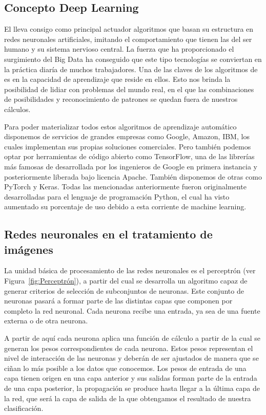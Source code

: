 \subsection{Concepto Deep Learning}\label{subsec:concepto-deep-learning}
El  lleva consigo como principal actuador algoritmos que basan su estructura en redes neuronales artificiales, imitando el comportamiento que tienen las del ser humano y su sistema nervioso central.
La fuerza que ha proporcionado el surgimiento del Big Data ha conseguido que este tipo tecnologías se conviertan en la práctica diaría de muchos trabajadores.
Una de las claves de los algoritmos de  es en la capacidad de aprendizaje que reside en ellos.
Esto nos brinda la posibilidad de lidiar con problemas del mundo real,
en el que las combinaciones de posibilidades y reconocimiento de patrones se quedan fuera de nuestros cálculos.

Para poder materializar todos estos algoritmos de aprendizaje automático disponemos de servicios de grandes empresas como Google, Amazon, IBM, los cuales
implementan sus propias soluciones comerciales.
Pero también podemos optar por herramientas de código abierto como TensorFlow, una de las librerías más famosas de  desarrollada por los ingenieros de Google en primera instancia y posteriormente liberada bajo licencia Apache.
También disponemos de otras como PyTorch y Keras.
Todas las mencionadas anteriormente fueron originalmente desarrolladas para el lenguaje de programación Python, el cual ha visto aumentado su porcentaje de uso debido a esta corriente de
machine learning.

\subsection{Redes neuronales en el tratamiento de imágenes}\label{subsec:redes-neuronales-en-el-tratamiento-de-imágenes}
La unidad básica de procesamiento de las redes neuronales es el perceptrón (ver Figura~\ref{fig:Perceptrón}),
a partir del cual se desarrolla un algoritmo capaz de generar criterios de selección de subconjuntos de neuronas.
Este conjunto de neuronas pasará a formar parte de las distintas capas que componen por completo la red neuronal.
Cada neurona recibe una entrada, ya sea de una fuente externa o de otra neurona.

A partir de aquí cada neurona aplica una función de cálculo a partir de la cual se generan los pesos correspondientes de cada neurona. Estos pesos representan el nivel de interacción de las neuronas y deberán de ser ajustados de manera que se ciñan lo más posible a los datos que conocemos.
Los pesos de entrada de una capa tienen origen en una capa anterior y sus salidas forman parte de la entrada de una capa posterior, la propagación se produce hasta llegar a la última capa de la red, que será la capa de salida de la que obtengamos el resultado de nuestra clasificación.


